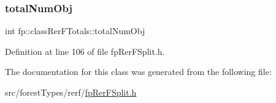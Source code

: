 \subsubsection{\texorpdfstring{total\+Num\+Obj}{totalNumObj}}
{\footnotesize\ttfamily int fp\+::class\+Rer\+F\+Totals\+::total\+Num\+Obj\hspace{0.3cm}{\ttfamily [protected]}}



Definition at line 106 of file fp\+Rer\+F\+Split.\+h.



The documentation for this class was generated from the following file\+:\begin{DoxyCompactItemize}
\item 
src/forest\+Types/rerf/\hyperlink{fpRerFSplit_8h}{fp\+Rer\+F\+Split.\+h}\end{DoxyCompactItemize}

